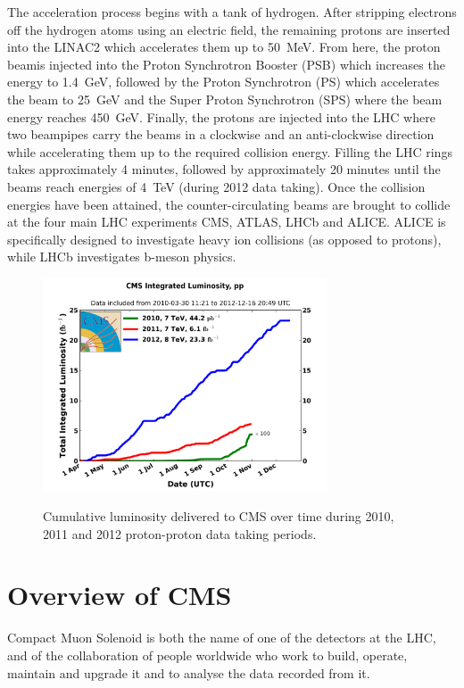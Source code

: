 The acceleration process begins with a tank of hydrogen. After stripping electrons off the hydrogen atoms
using an electric field, the remaining protons are inserted into the LINAC2 which accelerates them up to
50~MeV. From here, the proton beamis injected into the Proton Synchrotron Booster (PSB) which increases the
energy to 1.4~GeV, followed by the Proton Synchrotron (PS) which accelerates the beam to 25~GeV and the Super
Proton Synchrotron (SPS) where the beam energy reaches 450~GeV. Finally, the protons are injected into the LHC
where two beampipes carry the beams in a clockwise and an anti-clockwise direction while accelerating them
up to the required collision energy. Filling the LHC rings takes approximately 4 minutes, followed by
approximately 20 minutes until the beams reach energies of 4~TeV (during 2012 data taking). Once the collision
energies have been attained, the counter-circulating beams are brought to collide at the four main LHC
experiments CMS, ATLAS, LHCb and ALICE. ALICE is specifically designed to investigate heavy ion collisions
(as opposed to protons), while LHCb investigates b-meson physics.

\begin{figure}[hbtp]
   \centering
     \includegraphics[width=0.75\textwidth]{Chapters/03_Detector/Images/int_lumi_cumulative_pp_2.png}\\
     \caption{Cumulative luminosity delivered to CMS over time during 2010, 2011 and 2012 proton-proton data
     taking periods.}
     \label{fig:integrated_luminosity}
\end{figure}

\section{Overview of CMS}
\label{s:Overview}
Compact Muon Solenoid is both the name of one of the detectors at the LHC, and of the collaboration of
people worldwide who work to build, operate, maintain and upgrade it and to analyse the data recorded from it.

